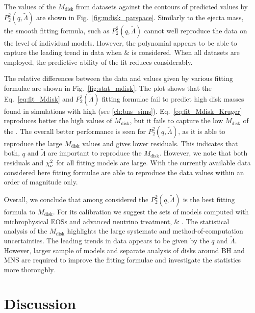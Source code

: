 The values of the $M_{\text{disk}}$ from datasets against the contours of predicted 
values by $P_2^2(q,\tilde{\Lambda})$ are shown in Fig.~\ref{fig:mdisk_parspace}.
Similarly to the ejecta mass, the smooth fitting formula, such as $P_2^2(q,\tilde{\Lambda})$
cannot well reproduce the data on the level of individual models. However, the 
polynomial appears to be able to capture the leading trend in data when 
\DSrefset{} \& \DSheatcool{} is considered.
When all datasets are employed, the predictive ability of the fit reduces considerably.

The relative differences between the data and values given by various fitting formulae are 
shown in Fig.~\ref{fig:stat_mdisk}.
The plot shows that the Eq.~\eqref{eq:fit_Mdisk} and $P_2^1(\tilde{\Lambda})$ fitting 
formulae fail to predict high disk masses found in simulations with high \mr{} 
(see \ref{ch:bns_sims}).
Eq.~\eqref{eq:fit_Mdisk_Kruger} reproduces better the high values of $M_{\text{disk}}$, 
but it fails to capture the low $M_{\text{disk}}$ of the \DSnone{}.
The overall better performance is seen for $P_2^2(q,\tilde{\Lambda})$, as it is able 
to reproduce the large $M_{\text{disk}}$ values and gives lower residuals.
This indicates that both, $q$ and $\tilde{\Lambda}$ are important to reproduce the 
$M_{\text{disk}}$.
However, we note that both residuals and $\chi_{\nu}^2$ for all fitting models are large.
With the currently available data considered here fitting formulae are able to reproduce 
the data values within an order of magnitude only.

Overall, we conclude that among considered the $P_2^2(q,\tilde{\Lambda})$ is the best 
fitting formula to $M_{\text{disk}}$. For its calibration we suggest the sets of 
models computed with michrophysical \acp{EOS} and advanced neutrino treatment, 
\DSrefset{} \& \DSheatcool{}.
The statistical analysis of the $M_{\text{disk}}$ highlights the large systematc 
and method-of-computation uncertainties. The leading trends in data appears to be given 
by the $q$ and $\tilde{\Lambda}$. However, larger sample of models and 
separate analysis of disks around \ac{BH} and \ac{MNS} are required to improve the 
fitting formulae and investigate the statistics more thoroughly. 



\section{Discussion}


